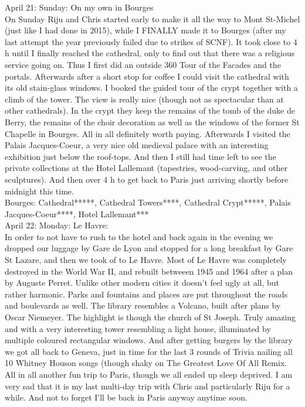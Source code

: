 April 21: Sunday: On my own in Bourges\\
On Sunday Riju and Chris started early to make it all the way to Mont St-Michel (just like I had done in 2015), while I FINALLY made it to Bourges (after my last attempt the year previously failed due to strikes of SCNF). It took close to 4 h until I finally reached the cathedral, only to find out that there was a religious service going on. Thus I first did an outside 360 Tour of the Facades and the portals. Afterwards after a short stop for coffee I could visit the cathedral with its old stain-glass windows. I booked the guided tour of the crypt together with a climb of the tower. The view is really nice (though not as spectacular than at other cathedrals). In the crypt they keep the remains of the tomb of the duke de Berry, the remains of the choir decoration as well as the windows of the former St Chapelle in Bourges. All in all definitely worth paying. Afterwards I visited the Palais Jacques-Coeur, a very nice old medieval palace with an interesting exhibition just below the roof-tops. And then I still had time left to see the private collections at the Hotel Lallemant (tapestries, wood-carving, and other sculptures). And then over 4 h to get back to Paris just arriving shortly before midnight this time.\\

Bourges: Cathedral*****, Cathedral Towers****, Cathedral Crypt*****,  Palais Jacques-Coeur****, Hotel Lallemant***\\

April 22: Monday: Le Havre:\\
In order to not have to rush to the hotel and back again in the evening we dropped our luggage by Gare de Lyon and stopped for a long breakfast by Gare St Lazare, and then we took of to Le Havre. Most of Le Havre was completely destroyed in the World War II, and rebuilt betweeen 1945 and 1964 after a plan by Auguste Perret. Unlike other modern cities it doesn't feel ugly at all, but rather harmonic. Parks and fountains and places are put throughout the roads and boulevards as well. The library resembles a Volcano, built after plans by Oscar Niemeyer. The highlight is though the church of St Joseph. Truly amazing and with a very interesting tower resembling a light house, illuminated by multiple coloured rectangular windows. And after getting burgers by the library we got all back to Geneva, just in time for the last 3 rounds of Trivia nailing all 10 Whitney Houson songs (though shaky on The Greatest Love Of All Remix. All in all another fun trip to Paris, though we all ended up sleep deprived. I am very sad that it is my last multi-day trip with Chris and particularly Riju for a while. And not to forget I'll be back in Paris anyway anytime soon.\\

